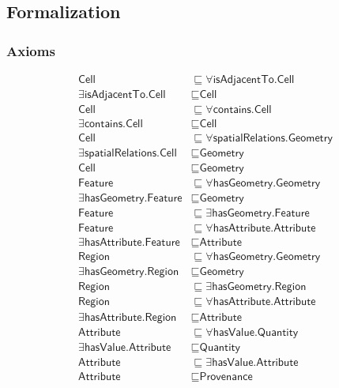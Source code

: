 \subsection{Formalization}
\label{ssec:formalization}
\subsubsection{Axioms}
\begin{align}
  \textsf{Cell} &\sqsubseteq \forall \textsf{isAdjacentTo.Cell} \\
  \exists \textsf{isAdjacentTo.Cell} &\sqsubseteq \textsf{Cell} \\
  \textsf{Cell} &\sqsubseteq \forall \textsf{contains.Cell} \\
  \exists \textsf{contains.Cell} &\sqsubseteq \textsf{Cell} \\
  \textsf{Cell} &\sqsubseteq \forall \textsf{spatialRelations.Geometry} \\
  \exists \textsf{spatialRelations.Cell} &\sqsubseteq \textsf{Geometry} \\
  \textsf{Cell} &\sqsubseteq \textsf{Geometry} \\
  \textsf{Feature} &\sqsubseteq \forall \textsf{hasGeometry.Geometry} \\
  \exists \textsf{hasGeometry.Feature} &\sqsubseteq \textsf{Geometry} \\
  \textsf{Feature} &\sqsubseteq \exists \textsf{hasGeometry.Feature} \\
  \textsf{Feature} &\sqsubseteq \forall \textsf{hasAttribute.Attribute} \\
  \exists \textsf{hasAttribute.Feature} &\sqsubseteq \textsf{Attribute} \\
  \textsf{Region} &\sqsubseteq \forall \textsf{hasGeometry.Geometry} \\
  \exists \textsf{hasGeometry.Region} &\sqsubseteq \textsf{Geometry} \\
  \textsf{Region} &\sqsubseteq \exists \textsf{hasGeometry.Region} \\
  \textsf{Region} &\sqsubseteq \forall \textsf{hasAttribute.Attribute} \\
  \exists \textsf{hasAttribute.Region} &\sqsubseteq \textsf{Attribute} \\
  \textsf{Attribute} &\sqsubseteq \forall \textsf{hasValue.Quantity} \\
  \exists \textsf{hasValue.Attribute} &\sqsubseteq \textsf{Quantity} \\
  \textsf{Attribute} &\sqsubseteq \exists \textsf{hasValue.Attribute} \\
  \textsf{Attribute} &\sqsubseteq \textsf{Provenance} \end{align}

